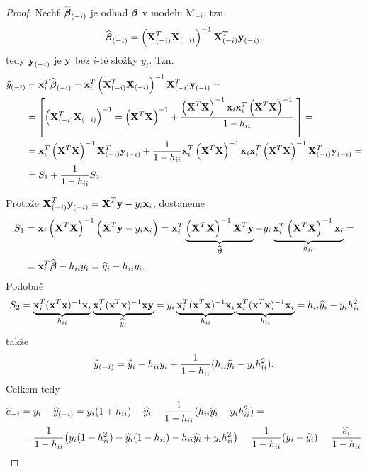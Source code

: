 \begin{proof}
	
	Nechť $\wbetab_{(-i)}$ je odhad $\betab$ v modelu M$_{-i}$, tzn.
	$$
	\wbetab_{(-i)} = \left( \X_{(-i)}^T \X_{(-i)} \right)^{-1} \X_{(-i)}^T \y_{(-i)},
	$$
	tedy $\y_{(-i)}$ je $\y$ bez $i$-té složky $y_i$. Tzn.
	\begin{align*}
	\hy_{(-i)} & = \x_i^T \wbetab_{(-i)} = \x_i^T \inv{\left( \X_{(-i)}^T \X_{(-i)} \right)} \X_{(-i)}^T \y_{(-i)} = \\
	 & = \left[ \left(  \X_{(-i)}^T \X_{(-i)} \right)^{-1} = \XtX + \frac{\XtX \x_i \x_i^T \XtX}{1 - \hii}. \right] = \\
	 & = \x_i^T \XtX \X_{(-i)}^T \y_{(-i)} + \frac{1}{1 - \hii} \x_i^T \XtX \x_i \x_i^T \XtX \X_{(-i)}^T \y_{(-i)} = \\
	 & = S_1 + \frac{1}{1-\hii} S_2.
	\end{align*}
	
	Protože $\X_{(-i)}^T \y_{(-i)} = \X^T \y - y_i \x_i$, dostaneme
	\begin{align*}
	S_1 & = \x_i \XtX \left( \X^T \y - y_i \x_i \right) = \x_i^T \underbrace{\XtX \X^T \y}_{\wbetab} - y_i \underbrace{\x_i^T \XtX \x_i}_{\hii} = \\
	& = \x_i^T \wbetab - \hii y_i = \hy_i - \hii y_i.
	\end{align*}
	Podobně	
	$$ S_2=\underbrace{\textbf{x}_i^T(\textbf{x}^T\textbf{x})^{-1}\textbf{x}_i}_{h_{ii}}\underbrace{\textbf{x}_i^T(\textbf{x}^T\textbf{x})^{-1}\textbf{x}\textbf{y}}_{\hyi}=y_i\underbrace{\textbf{x}_i^T(\textbf{x}^T\textbf{x})^{-1}\textbf{x}_i}_{h_{ii}}\underbrace{\textbf{x}_i^T(\textbf{x}^T\textbf{x})^{-1}\textbf{x}_i}_{h_{ii}}=h_{ii}\hyi-y_ih_{ii}^2 $$
	takže 
	$$ \hy_{(-i)}=\hyi-h_{ii}y_i+\frac{1}{1-h_{ii}}(h_{ii}\hyi-y_ih_{ii}^2).$$
	Celkem tedy 
	\begin{align*}
	\he_{-i} & =y_i-\hy_{(-i)}=y_i(1+h_{ii})-\hyi-\frac{1}{1-h_{ii}}(h_{ii}\hyi-y_ih_{ii}^2)= \\
	&=\frac{1}{1-h_{ii}}\big(y_i(1-h_{ii}^2)-\hyi(1-h_{ii})-h_{ii}\hyi+y_ih_{ii}^2\big)=\frac{1}{1-h_{ii}}(y_i-\hyi)=\frac{\hei}{1-h_{ii}}
	\end{align*}
\end{proof}